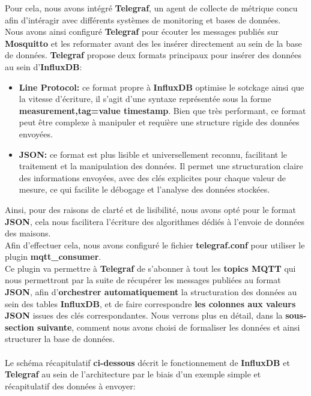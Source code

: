 \documentclass[10pt, a4paper]{report}
\begin{document}
	Pour cela, nous avons intégré \textbf{Telegraf}, un agent de collecte de métrique concu afin d'intéragir avec différents systèmes de monitoring et bases de données.\\
	Nous avons ainsi configuré \textbf{Telegraf} pour écouter les messages publiés sur \textbf{Mosquitto} et les reformater avant des les insérer directement au sein de la base de données.\newpage
	\textbf{Telegraf} propose deux formats principaux pour insérer des données au sein d'\textbf{InfluxDB}:
	\begin{itemize}
		\item \textbf{Line Protocol:} ce format propre à \textbf{InfluxDB} optimise le sotckage ainsi que la vitesse d'écriture, il s'agit d'une syntaxe représentée sous la forme \textbf{measurement,tag=value timestamp}. Bien que très performant, ce format peut être complexe à manipuler et requière une structure rigide des données envoyées.
		
		\item \textbf{JSON:} ce format est plus lisible et universellement reconnu, facilitant le traitement et la manipulation des données. Il permet une structuration claire des informations envoyées, avec des clés explicites pour chaque valeur de mesure, ce qui facilite le débogage et l’analyse des données stockées.
	\end{itemize}
	Ainsi, pour des raisons de clarté et de lisibilité, nous avons opté pour le format \textbf{JSON}, cela nous facilitera l'écriture des algorithmes dédiés à l'envoie de données des maisons.\\
	Afin d'effectuer cela, nous avons configuré le fichier \textbf{telegraf.conf} pour utiliser le plugin \textbf{mqtt\_consumer}.\\
	Ce plugin va permettre à \textbf{Telegraf} de s'abonner à tout les \textbf{topics MQTT} qui nous permettront par la suite de récupérer les messages publiées au format \textbf{JSON}, afin d'\textbf{orchestrer automatiquement} la structuration des données au sein des tables \textbf{InfluxDB}, et de faire correspondre \textbf{les colonnes aux valeurs JSON} issues des clés correspondantes. Nous verrons plus en détail, dans la \textbf{sous-section suivante}, comment nous avons choisi de formaliser les données et ainsi structurer la base de données.\\\\
	Le schéma récapitulatif \textbf{ci-dessous} décrit le fonctionnement de \textbf{InfluxDB} et \textbf{Telegraf} au sein de l'architecture par le biais d'un exemple simple et récapitulatif des données à envoyer:
	
\end{document}
